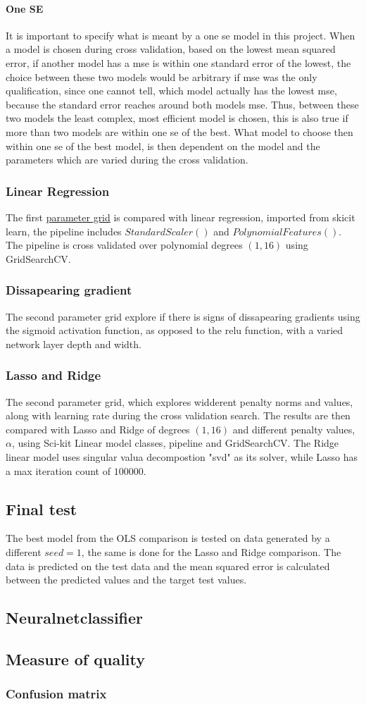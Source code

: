 \paragraph{One SE}
It is important to specify what is meant by a one se model in this project. 
When a model is chosen during cross validation, based on the lowest mean squared
error, if another model has a mse is within one standard error of the lowest, 
the choice between these two models would be arbitrary if mse was the only qualification,
since one cannot tell, which model actually has the lowest mse, because the standard
error reaches around both models mse. Thus, between these two models 
the least complex, most efficient model is chosen, this is also true
if more than two models are within one se of the best. What model to choose then
within one se of the best model, is then dependent on the model and the
parameters which are varied during the cross validation.
\subsubsection{Linear Regression}
The first \hyperref[tab:ParamGrid1]{parameter grid} is compared 
with linear regression, imported from skicit learn, the pipeline includes
$StandardScaler()$ and $PolynomialFeatures()$. The pipeline is 
cross validated over polynomial degrees $(1,16)$ using GridSearchCV. 
\subsubsection{Dissapearing gradient}
The second parameter grid explore if there is signs of 
dissapearing gradients using the sigmoid activation function, as opposed
to the relu function, with a varied network layer depth and width.
\subsubsection{Lasso and Ridge}
The second parameter grid, which explores widderent penalty norms and values,
along with learning rate during the cross validation search. The results are 
then compared with Lasso and Ridge of degrees $(1, 16)$ and different 
penalty values, $\alpha$, using Sci-kit Linear model classes, pipeline and GridSearchCV. 
The Ridge linear model uses singular valua decompostion "svd" as its solver, while 
Lasso has a max iteration count of $100000$.
\subsection{Final test}
The best model from the OLS comparison is tested on data generated by a different
$seed = 1$, the same is done for the Lasso and Ridge comparison. The data is 
predicted on the test data and the mean squared error is calculated between
the predicted values and the target test values. 

\subsection{Neuralnetclassifier}
\subsection{Measure of quality}
\subsubsection{Confusion matrix}
